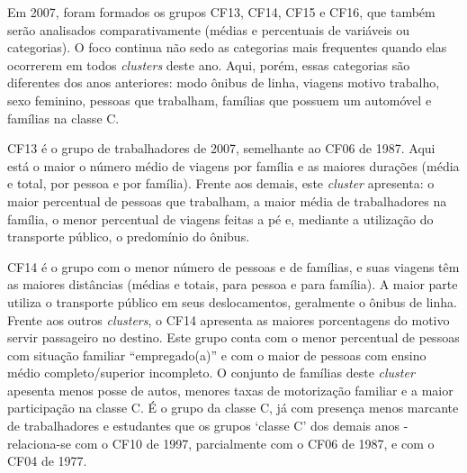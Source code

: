 \newpage
Em 2007, foram formados os grupos CF13, CF14, CF15 e CF16, que também serão analisados comparativamente (médias e percentuais de variáveis ou categorias).
O foco continua não sedo as categorias mais frequentes quando elas ocorrerem em todos \textit{clusters} deste ano. Aqui, porém, essas categorias são diferentes dos anos anteriores: modo ônibus de linha, viagens motivo trabalho, sexo feminino, pessoas que trabalham, famílias que possuem um automóvel e famílias na classe C.

CF13 é o grupo de trabalhadores de 2007, semelhante ao CF06 de 1987.
Aqui está o maior o número médio de viagens por família e as maiores durações (média e total, por pessoa e por família).
Frente aos demais, este \textit{cluster} apresenta: 
o maior percentual de pessoas que trabalham, 
a maior média de trabalhadores na família,
o menor percentual de viagens feitas a pé e, mediante a utilização do transporte público, o predomínio do ônibus.

CF14 é o grupo com o menor número de pessoas e de famílias, e suas viagens têm as maiores distâncias (médias e totais, para pessoa e para família).
A maior parte utiliza o transporte público em seus deslocamentos, geralmente o ônibus de linha.
Frente aos outros \textit{clusters}, o CF14 apresenta as maiores porcentagens do motivo servir passageiro no destino.
Este grupo conta com o menor percentual de pessoas com situação familiar ``empregado(a)'' e com o maior de pessoas com ensino médio completo/superior incompleto.
O conjunto de famílias deste \textit{cluster} apesenta menos posse de autos, menores taxas de motorização familiar e a maior participação na classe C.
É o grupo da classe C, já com presença menos marcante de trabalhadores e estudantes que os grupos `classe C' dos demais anos - relaciona-se com o CF10 de 1997, parcialmente com o CF06 de 1987, e com o CF04 de 1977.

